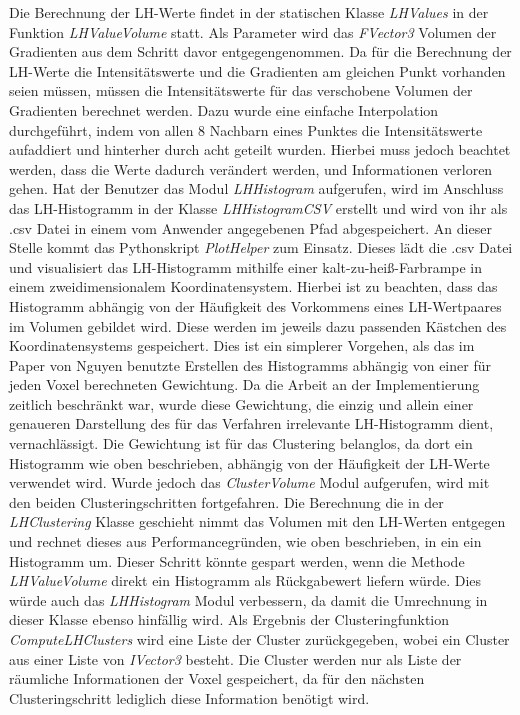 Die Berechnung der LH-Werte findet in der statischen Klasse \textit{LHValues} in der Funktion \textit{LHValueVolume} statt. Als Parameter wird das \textit{FVector3} Volumen der Gradienten aus dem Schritt davor entgegengenommen. Da für die Berechnung der LH-Werte die Intensitätswerte und die Gradienten am gleichen Punkt vorhanden seien müssen, müssen die Intensitätswerte für das verschobene Volumen der Gradienten berechnet werden. Dazu wurde eine einfache Interpolation durchgeführt, indem von allen 8 Nachbarn eines Punktes die Intensitätswerte aufaddiert und hinterher durch acht geteilt wurden. Hierbei muss jedoch beachtet werden, dass die Werte dadurch verändert werden, und Informationen verloren gehen.
\newline
Hat der Benutzer das Modul \textit{LHHistogram} aufgerufen, wird im Anschluss das LH-Histogramm in der Klasse \textit{LHHistogramCSV} erstellt und wird von ihr als .csv Datei in einem vom Anwender angegebenen Pfad abgespeichert.
\newline
An dieser Stelle kommt das Pythonskript \textit{PlotHelper} zum Einsatz. Dieses lädt die .csv Datei und visualisiert das LH-Histogramm mithilfe einer kalt-zu-heiß-Farbrampe in einem zweidimensionalem Koordinatensystem.
\newline
Hierbei ist zu beachten, dass das Histogramm abhängig von der Häufigkeit des Vorkommens eines LH-Wertpaares im Volumen gebildet wird. Diese werden im jeweils dazu passenden Kästchen des Koordinatensystems gespeichert. Dies ist ein simplerer Vorgehen, als das im Paper von Nguyen \cite{nguyen2012clustering} benutzte Erstellen des Histogramms abhängig von einer für jeden Voxel berechneten Gewichtung. Da die Arbeit an der Implementierung zeitlich beschränkt war, wurde diese Gewichtung, die einzig und allein einer genaueren Darstellung des für das Verfahren irrelevante LH-Histogramm dient, vernachlässigt. Die Gewichtung ist für das Clustering belanglos, da dort ein Histogramm wie oben beschrieben, abhängig von der Häufigkeit der LH-Werte verwendet wird. 
\newline
Wurde jedoch das \textit{ClusterVolume} Modul aufgerufen, wird mit den beiden Clusteringschritten fortgefahren.
Die Berechnung die in der \textit{LHClustering} Klasse geschieht nimmt das Volumen mit den LH-Werten entgegen und rechnet dieses aus Performancegründen, wie oben beschrieben, in ein ein Histogramm um. Dieser Schritt könnte gespart werden, wenn die Methode \textit{LHValueVolume} direkt ein Histogramm als Rückgabewert liefern würde. Dies würde auch das \textit{LHHistogram} Modul verbessern, da damit die Umrechnung in dieser Klasse ebenso hinfällig wird. Als Ergebnis der Clusteringfunktion \textit{ComputeLHClusters} wird eine Liste der Cluster zurückgegeben, wobei ein Cluster aus einer Liste von \textit{IVector3} besteht. Die Cluster werden nur als Liste der räumliche Informationen der Voxel gespeichert, da für den nächsten Clusteringschritt  lediglich diese Information benötigt wird. 
